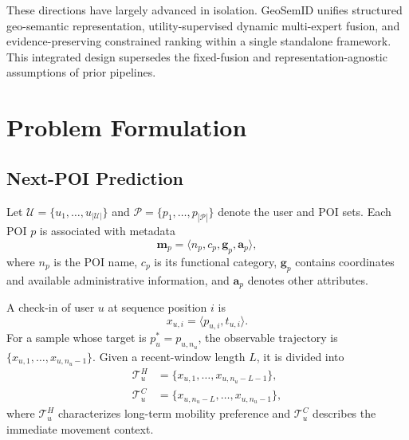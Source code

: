\documentclass[journal]{IEEEtran}
\newcommand{\POIs}{\mathcal{P}}
\newcommand{\Users}{\mathcal{U}}
\begin{document}
These directions have largely advanced in isolation. GeoSemID unifies structured
geo-semantic representation, utility-supervised dynamic multi-expert fusion, and
evidence-preserving constrained ranking within a single standalone framework.
This integrated design supersedes the fixed-fusion and representation-agnostic
assumptions of prior pipelines.

\section{Problem Formulation}
\label{sec:problem}

\subsection{Next-POI Prediction}

Let $\Users=\{u_1,\ldots,u_{|\Users|}\}$ and
$\POIs=\{p_1,\ldots,p_{|\POIs|}\}$ denote the user and POI sets.
Each POI $p$ is associated with metadata
\begin{equation}
\bm{m}_{p}
=
\langle n_p,c_p,\bm{g}_p,\bm{a}_p\rangle,
\label{eq:poi_metadata}
\end{equation}
where $n_p$ is the POI name, $c_p$ is its functional category,
$\bm{g}_p$ contains coordinates and available administrative information,
and $\bm{a}_p$ denotes other attributes.

A check-in of user $u$ at sequence position $i$ is
\begin{equation}
x_{u,i}=\langle p_{u,i},t_{u,i}\rangle.
\label{eq:checkin}
\end{equation}
For a sample whose target is $p_u^{*}=p_{u,n_u}$, the observable trajectory is
$\{x_{u,1},\ldots,x_{u,n_u-1}\}$.
Given a recent-window length $L$, it is divided into
\begin{align}
\mathcal{T}_{u}^{H}
&=
\{x_{u,1},\ldots,x_{u,n_u-L-1}\},
\label{eq:historical_trajectory}\\
\mathcal{T}_{u}^{C}
&=
\{x_{u,n_u-L},\ldots,x_{u,n_u-1}\},
\label{eq:current_trajectory}
\end{align}
where $\mathcal{T}_{u}^{H}$ characterizes long-term mobility preference and
$\mathcal{T}_{u}^{C}$ describes the immediate movement context.
\end{document}
